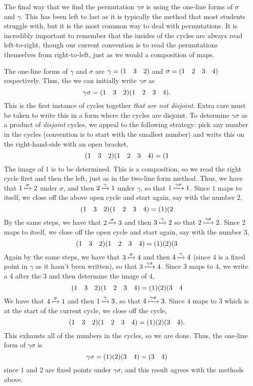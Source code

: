 \begin{example}
     The final way that we find the permutation $\gamma\sigma$ is using the one-line forms of $\sigma$ and $\gamma$. This has been left to last as it is typically the method that most students struggle with, but it is the most common way to deal with permutations. It is incredibly important to remember that the insides of the cycles are always read left-to-right, though our current convention is to read the permutations themselves from right-to-left, just as we would a composition of maps.

    The one-line forms of $\gamma$ and $\sigma$ are $\gamma = (1 \quad 3 \quad 2)$ and $\sigma = (1 \quad 2 \quad 3 \quad 4)$ respectively. Thus, the we can initially write $\gamma\sigma$ as
    \[
    \gamma\sigma = (1 \quad 3 \quad 2)(1 \quad 2 \quad 3 \quad 4).
    \]
    This is the first instance of cycles together \textit{that are not disjoint}. Extra care must be taken to write this in a form where the cycles are disjoint. To determine $\gamma\sigma$ as a product of \textit{disjoint} cycles, we appeal to the following strategy: pick any number in the cycles (convention is to start with the smallest number) and write this on the right-hand-side with an open bracket,
    \[
    (1 \quad 3 \quad 2)(1 \quad 2 \quad 3 \quad 4) = (1
    \]
    The image of $1$ is to be determined. This is a composition, so we read the right cycle first and then the left, just as in the two-line form method. Thus, we have that $1 \xmapsto{\sigma} 2$ under $\sigma$, and then $2 \xmapsto{\gamma} 1$ under $\gamma$, so that $1 \xmapsto{\gamma\sigma} 1$. Since $1$ maps to itself, we close off the above open cycle and start again, say with the number $2$,
    \[
    (1 \quad 3 \quad 2)(1 \quad 2 \quad 3 \quad 4) = (1)(2
    \]
    By the same steps, we have that $2 \xmapsto{\sigma} 3$ and then $3 \xmapsto{\gamma} 2$ so that $2 \xmapsto{\gamma\sigma} 2$. Since $2$ maps to itself, we close off the open cycle and start again, say with the number $3$,
    \[
    (1 \quad 3 \quad 2)(1 \quad 2 \quad 3 \quad 4) = (1)(2)(3
    \]
    Again by the same steps, we have that $3 \xmapsto{\sigma} 4$ and then $4 \xmapsto{\gamma} 4$ (since $4$ is a fixed point in $\gamma$ as it hasn't been written), so that $3 \xmapsto{\gamma\sigma} 4$. Since $3$ maps to $4$, we write a $4$ after the $3$ and then determine the image of $4$,
    \[
    (1 \quad 3 \quad 2)(1 \quad 2 \quad 3 \quad 4) = (1)(2)(3 \quad 4
    \]
    We have that $4 \xmapsto{\sigma} 1$ and then $1 \xmapsto{\gamma} 3$, so that $4 \xmapsto{\gamma\sigma} 3$. Since $4$ maps to $3$ which is at the start of the current cycle, we close off the cycle,
    \[
    (1 \quad 3 \quad 2)(1 \quad 2 \quad 3 \quad 4) = (1)(2)(3 \quad 4).
    \]
    This exhausts all of the numbers in the cycles, so we are done. Thus, the one-line form of $\gamma\sigma$ is
    \[
    \gamma\sigma = (1)(2)(3 \quad 4) = (3 \quad 4)
    \]
    since $1$ and $2$ are fixed points under $\gamma\sigma$, and this result agrees with the methods above.
\end{example}


